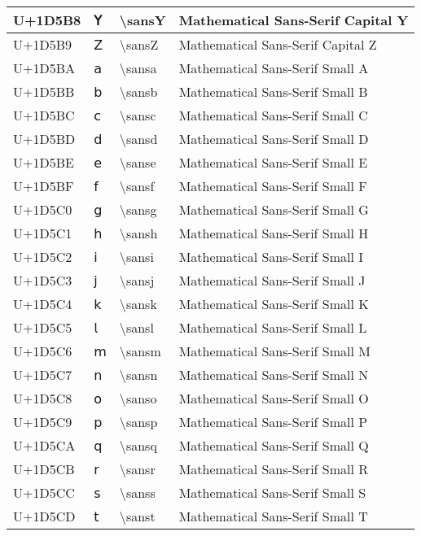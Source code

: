 \begin{table}[h]
\begin{tabulary}{\linewidth}{|L|L|L|L|}
\hline
U+1D5B8 & 𝖸 & {\textbackslash}sansY & Mathematical Sans-Serif Capital Y \\
\hline
U+1D5B9 & 𝖹 & {\textbackslash}sansZ & Mathematical Sans-Serif Capital Z \\
\hline
U+1D5BA & 𝖺 & {\textbackslash}sansa & Mathematical Sans-Serif Small A \\
\hline
U+1D5BB & 𝖻 & {\textbackslash}sansb & Mathematical Sans-Serif Small B \\
\hline
U+1D5BC & 𝖼 & {\textbackslash}sansc & Mathematical Sans-Serif Small C \\
\hline
U+1D5BD & 𝖽 & {\textbackslash}sansd & Mathematical Sans-Serif Small D \\
\hline
U+1D5BE & 𝖾 & {\textbackslash}sanse & Mathematical Sans-Serif Small E \\
\hline
U+1D5BF & 𝖿 & {\textbackslash}sansf & Mathematical Sans-Serif Small F \\
\hline
U+1D5C0 & 𝗀 & {\textbackslash}sansg & Mathematical Sans-Serif Small G \\
\hline
U+1D5C1 & 𝗁 & {\textbackslash}sansh & Mathematical Sans-Serif Small H \\
\hline
U+1D5C2 & 𝗂 & {\textbackslash}sansi & Mathematical Sans-Serif Small I \\
\hline
U+1D5C3 & 𝗃 & {\textbackslash}sansj & Mathematical Sans-Serif Small J \\
\hline
U+1D5C4 & 𝗄 & {\textbackslash}sansk & Mathematical Sans-Serif Small K \\
\hline
U+1D5C5 & 𝗅 & {\textbackslash}sansl & Mathematical Sans-Serif Small L \\
\hline
U+1D5C6 & 𝗆 & {\textbackslash}sansm & Mathematical Sans-Serif Small M \\
\hline
U+1D5C7 & 𝗇 & {\textbackslash}sansn & Mathematical Sans-Serif Small N \\
\hline
U+1D5C8 & 𝗈 & {\textbackslash}sanso & Mathematical Sans-Serif Small O \\
\hline
U+1D5C9 & 𝗉 & {\textbackslash}sansp & Mathematical Sans-Serif Small P \\
\hline
U+1D5CA & 𝗊 & {\textbackslash}sansq & Mathematical Sans-Serif Small Q \\
\hline
U+1D5CB & 𝗋 & {\textbackslash}sansr & Mathematical Sans-Serif Small R \\
\hline
U+1D5CC & 𝗌 & {\textbackslash}sanss & Mathematical Sans-Serif Small S \\
\hline
U+1D5CD & 𝗍 & {\textbackslash}sanst & Mathematical Sans-Serif Small T \\

\end{tabulary}
\end{table}
